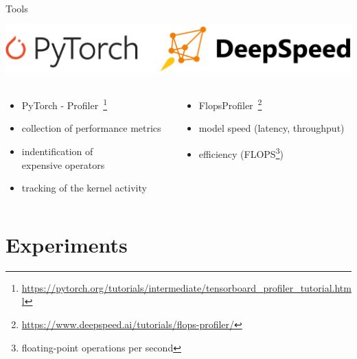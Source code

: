 \documentclass[compress,aspectratio=169]{beamer}
\begin{document}
\begin{frame}[t]{Tools}
    \begin{center}
        \includegraphics[width=1\textwidth]{./assets/tools}
    \end{center}
    \begin{columns}[t]
    \begin{column}{0.5\textwidth}
                \begin{itemize}
                    \item PyTorch - Profiler~\footnote{\tiny{\url{https://pytorch.org/tutorials/intermediate/tensorboard_profiler_tutorial.html}}}
                    \item collection of performance metrics
                    \item indentification of\\expensive operators
                    \item tracking of the kernel activity
                \end{itemize}
    \end{column}
    \begin{column}{0.5\textwidth}
                \begin{itemize}
                    \item FlopsProfiler~\footnote{\tiny{\url{https://www.deepspeed.ai/tutorials/flops-profiler/}}}
                    \item model speed (latency, throughput)
                    \item efficiency (FLOPS\footnote{\tiny{floating-point operations per second}})
                \end{itemize}
    \end{column}
    \end{columns}
\end{frame}

\section{Experiments}
\sectionIntro %
\end{document}
